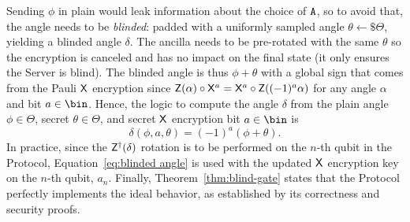 Sending $\phi$ in plain would leak information about the choice of $\mathtt{A}$, so to avoid that, the angle needs to be \emph{blinded}: padded with a uniformly sampled angle $\theta\gets \$\Theta$, yielding a blinded angle $\delta$. The ancilla needs to be pre-rotated with the same $\theta$ so the encryption is canceled and has no impact on the final state (it only ensures the Server is blind).
The blinded angle is thus $\phi+\theta$ with a global sign that comes from the Pauli $\mathsf{X}$ encryption since $\mathsf{Z}(\alpha)\circ\mathsf{X}^a = \mathsf{X}^a\circ\mathsf{Z}((-1)^a\alpha)$ for any angle $\alpha$ and bit $a\in\bin$.
Hence, the logic to compute the angle $\delta$ from the plain angle $\phi\in\Theta$, secret $\theta\in\Theta$, and secret $\mathsf{X}$ encryption bit $a\in\bin$ is
\begin{equation}
    \label{eq:blinded angle}
    \delta(\phi, a, \theta)=(-1)^a (\phi+\theta).
\end{equation}
In practice, since the $\mathsf{Z}^\dagger(\delta)$ rotation is to be performed on the $n$-th qubit in the Protocol, Equation~\ref{eq:blinded angle} is used with the updated $\mathsf{X}$ encryption key on the $n$-th qubit, $a_n$.
Finally, Theorem~\ref{thm:blind-gate} states that the Protocol perfectly implements the ideal behavior, as established by its correctness and security proofs.

